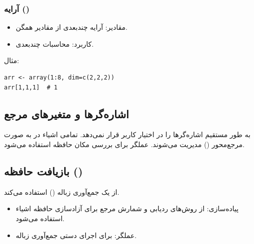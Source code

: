 \documentclass[11pt, a4paper, oneside]{book}
\begin{document}
				\subsubsection{آرایه ()}
				
					\begin{itemize}
						
						\item {\large مقادیر}:
						{\normalsize  آرایه چندبعدی از مقادیر همگن.}
						
						\item {\large کاربرد}:
						{\normalsize محاسبات چندبعدی.}
						
					\end{itemize}
					
					مثال:
					
					\begin{latin}
						\begin{lstlisting}[caption={\lr{Array data type}}] 
arr <- array(1:8, dim=c(2,2,2))
arr[1,1,1]  # 1

						\end{lstlisting}
					\end{latin}
				
			\subsection{اشاره‌گرها و متغیرهای مرجع}
				
				 به طور مستقیم اشاره‌گرها را در اختیار کاربر قرار نمی‌دهد.
				تمامی اشیاء در  به صورت مرجع‌محور () مدیریت می‌شوند.
				عملگر  برای بررسی مکان حافظه استفاده می‌شود.
		
			\subsection{بازیافت حافظه ()}
			
				 از یک جمع‌آوری زباله () استفاده می‌کند.
				
				\begin{itemize}
					
					\item {\large پیاده‌سازی}:
					{\normalsize از روش‌های ردیابی و شمارش مرجع برای آزادسازی حافظه اشیاء استفاده می‌شود.}
					
					\item {\large عملگر}:
					{\normalsize {} برای اجرای دستی جمع‌آوری زباله.}
					
				\end{itemize}
		
\end{document}

